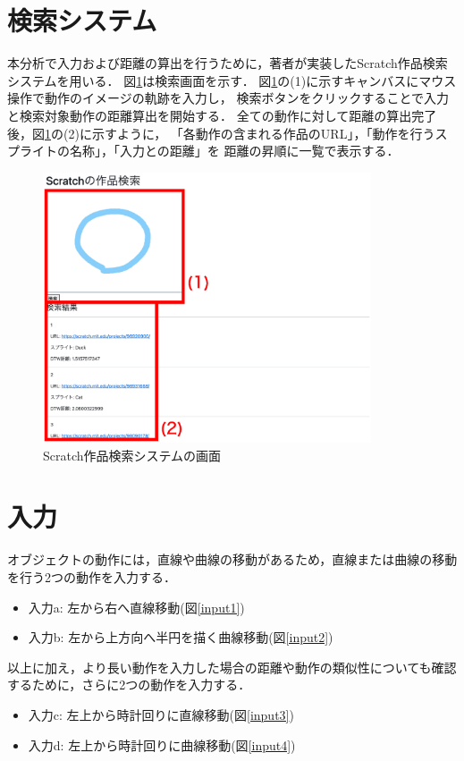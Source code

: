 \documentclass[11pt]{jreport}
\begin{document}
\section{検索システム}
本分析で入力および距離の算出を行うために，著者が実装したScratch作品検索システムを用いる．
図\ref{systemdisplay}は検索画面を示す．
図\ref{systemdisplay}の(1)に示すキャンバスにマウス操作で動作のイメージの軌跡を入力し，
検索ボタンをクリックすることで入力と検索対象動作の距離算出を開始する．
全ての動作に対して距離の算出完了後，図\ref{systemdisplay}の(2)に示すように，
「各動作の含まれる作品のURL」，「動作を行うスプライトの名称」，「入力との距離」を
距離の昇順に一覧で表示する．

\begin{figure}[H]
    \centering
    \includegraphics[height=8cm]{systemdisplay.eps}
    \caption{Scratch作品検索システムの画面}
    \label{systemdisplay}
\end{figure}

\section{入力}
オブジェクトの動作には，直線や曲線の移動があるため，直線または曲線の移動を行う2つの動作を入力する．

\begin{itemize}
    \item 入力a: 左から右へ直線移動(図\ref{input1})
    \item 入力b: 左から上方向へ半円を描く曲線移動(図\ref{input2})
\end{itemize}

以上に加え，より長い動作を入力した場合の距離や動作の類似性についても確認するために，さらに2つの動作を入力する．

\begin{itemize}
    \item 入力c: 左上から時計回りに直線移動(図\ref{input3})
    \item 入力d: 左上から時計回りに曲線移動(図\ref{input4})
\end{itemize}
\end{document}
